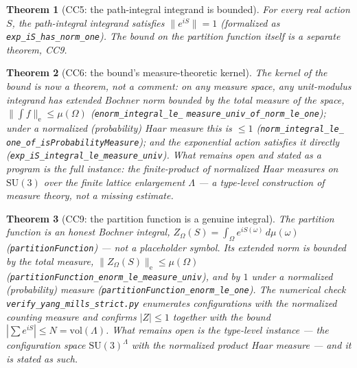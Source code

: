 \documentclass[aps,prd,preprint,superscriptaddress,amsmath,amssymb]{revtex4-2}
\newtheorem{theorem}{Theorem}[section]
\begin{document}
\begin{theorem}[CC5: the path-integral integrand is bounded]
\label{thm:cc5}
For every real action $S$, the path-integral integrand satisfies
$\|e^{iS}\|=1$ (formalized as
\texttt{exp\_iS\_has\_norm\_one}).  The bound on the partition
function itself is a separate theorem, CC9.
\end{theorem}

\begin{theorem}[CC6: the bound's measure-theoretic kernel]
\label{thm:cc6}
The kernel of the bound is now a theorem, not a comment: on any
measure space, any unit-modulus integrand has extended Bochner norm
bounded by the total measure of the space, $\bigl\|\int f\bigr\|_\mathrm{e}\le
\mu(\Omega)$ (\texttt{enorm\_integral\_le\_}\allowbreak
\texttt{measure\_univ\_of\_norm\_le\_one});
under a normalized (probability) Haar measure this is $\le 1$
(\texttt{norm\_integral\_le\_}\allowbreak
\texttt{one\_of\_isProbabilityMeasure}); and the
exponential action satisfies it directly
(\texttt{exp\_iS\_integral\_le\_measure\_univ}).  What remains open and
stated as a program is the full instance: the finite-product of
normalized Haar measures on $\mathrm{SU}(3)$ over the finite lattice
enlargement $\Lambda$ --- a type-level construction of measure
theory, not a missing estimate.
\end{theorem}

\begin{theorem}[CC9: the partition function is a genuine integral]
\label{thm:cc9}
The partition function is an honest Bochner integral,
$Z_\Omega(S)=\int_\Omega e^{iS(\omega)}\,d\mu(\omega)$
(\texttt{partitionFunction}) --- not a placeholder symbol.  Its extended
norm is bounded by the total measure,
$\|Z_\Omega(S)\|_\mathrm{e}\le\mu(\Omega)$
(\texttt{partitionFunction\_enorm\_le\_\allowbreak measure\_univ}), and by $1$
under a normalized (probability) measure
(\texttt{partitionFunction\_enorm\_le\_\allowbreak one}).  The numerical check
\texttt{verify\_yang\_mills\_\allowbreak strict.py} enumerates configurations with
the normalized counting measure and confirms $|Z|\le1$ together with the
bound $|\sum e^{iS}|\le N=\mathrm{vol}(\Lambda)$.  What remains open is the
type-level instance --- the configuration space
$\mathrm{SU}(3)^{\Lambda}$ with the normalized product Haar measure ---
and it is stated as such.
\end{theorem}
\end{document}
